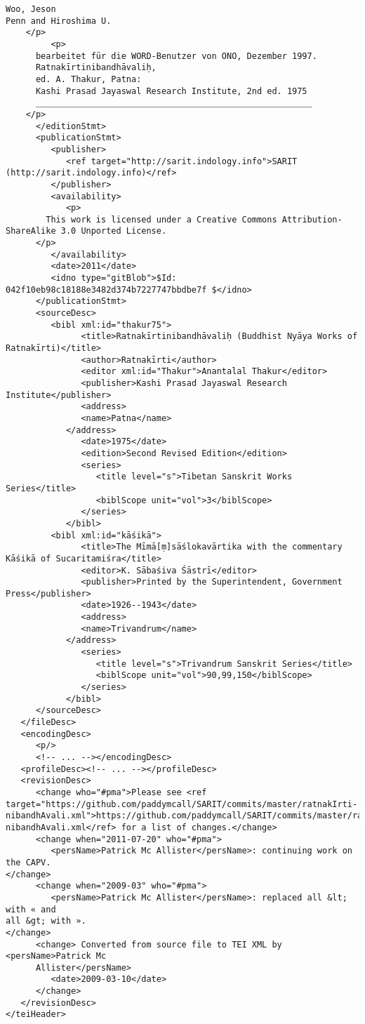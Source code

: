 \documentclass[article,a4paper]{memoir}
\begin{document}
\begin{landscape}
\begin{verbatim}
Woo, Jeson 
Penn and Hiroshima U.
	</p>
         <p>
	  bearbeitet für die WORD-Benutzer von ONO, Dezember 1997. 
	  Ratnakīrtinibandhāvaliḥ,
	  ed. A. Thakur, Patna:
	  Kashi Prasad Jayaswal Research Institute, 2nd ed. 1975
	  _______________________________________________________
	</p>
      </editionStmt>
      <publicationStmt>
         <publisher>
            <ref target="http://sarit.indology.info">SARIT (http://sarit.indology.info)</ref>
         </publisher>
         <availability>
            <p>
	    This work is licensed under a Creative Commons Attribution-ShareAlike 3.0 Unported License.
	  </p>
         </availability>
         <date>2011</date>
         <idno type="gitBlob">$Id: 042f10eb98c18188e3482d374b7227747bbdbe7f $</idno>
      </publicationStmt>
      <sourceDesc>
         <bibl xml:id="thakur75">
	           <title>Ratnakīrtinibandhāvaliḥ (Buddhist Nyāya Works of Ratnakīrti)</title>
	           <author>Ratnakīrti</author>
	           <editor xml:id="Thakur">Anantalal Thakur</editor>
	           <publisher>Kashi Prasad Jayaswal Research Institute</publisher>
	           <address>
               <name>Patna</name>
            </address>
	           <date>1975</date>
	           <edition>Second Revised Edition</edition>
	           <series>
	              <title level="s">Tibetan Sanskrit Works Series</title>
	              <biblScope unit="vol">3</biblScope>
	           </series>
	        </bibl>
         <bibl xml:id="kāśikā">
	           <title>The Mīmā[ṃ]sāślokavārtika with the commentary Kāśikā of Sucaritamiśra</title>
	           <editor>K. Sābaśiva Śāstrī</editor>
	           <publisher>Printed by the Superintendent, Government Press</publisher>
	           <date>1926--1943</date>
	           <address>
               <name>Trivandrum</name>
            </address>
	           <series>
	              <title level="s">Trivandrum Sanskrit Series</title>
	              <biblScope unit="vol">90,99,150</biblScope>
	           </series>
	        </bibl>
      </sourceDesc>
   </fileDesc>
   <encodingDesc>
      <p/>
      <!-- ... --></encodingDesc>
   <profileDesc><!-- ... --></profileDesc>
   <revisionDesc>
      <change who="#pma">Please see <ref target="https://github.com/paddymcall/SARIT/commits/master/ratnakIrti-nibandhAvali.xml">https://github.com/paddymcall/SARIT/commits/master/ratnakIrti-nibandhAvali.xml</ref> for a list of changes.</change>
      <change when="2011-07-20" who="#pma">
         <persName>Patrick Mc Allister</persName>: continuing work on the CAPV.
</change>
      <change when="2009-03" who="#pma">
         <persName>Patrick Mc Allister</persName>: replaced all &lt; with « and
all &gt; with ».
</change>
      <change> Converted from source file to TEI XML by <persName>Patrick Mc
      Allister</persName> 
         <date>2009-03-10</date>
      </change>
   </revisionDesc>
</teiHeader>
	 \end{verbatim}
	 \end{landscape}
       
      \clearpage
      \begin{english}
      \printshorthands
      \printbibliography
      \end{english}
    
\end{document}
